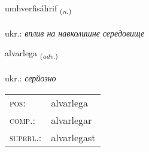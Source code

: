 \documentclass[frontgrid, backgrid]{flacards}\usepackage[]{graphicx}\usepackage[]{xcolor}
\begin{document}
\renewcommand{\blhead}{\vskip5pt {\small\bfseries\footnotesize Nafnorð | іменник }}
\renewcommand{\bcfoot}{\vskip5pt \hspace{2pt}{\small\bfseries\footnotesize 3K}}


{umhverfisáhrif \small{\textsubscript{(\textit{n.})}} \\[1ex] %
\textphonetic{[ʏmkʰvɛrvɪsaur̥ɪv]} \\
ukr.: \emph{вплив на навколишнє середовище} \\  [2ex]
\renewcommand*{\arraystretch}{0.8}
}

\renewcommand{\flhead}{\vskip5pt \fboxsep=0pt {\small\bfseries\footnotesize Atviksorð | прислівник}}
\renewcommand{\fcfoot}{\vskip5pt \fboxsep=0pt \hspace{2pt}{\small\bfseries\footnotesize 3K}}

\renewcommand{\blhead}{\vskip5pt {\small\bfseries\footnotesize Atviksorð | прислівник }}
\renewcommand{\bcfoot}{\vskip5pt \hspace{2pt}{\small\bfseries\footnotesize 3K}}


{alvarlega \small{\textsubscript{(\textit{adv.})}} \\[1ex] %
\textphonetic{[alvarlɛɣa]} \\
ukr.: \emph{серйозно} \\  [2ex]
\renewcommand*{\arraystretch}{0.8}
\begin{tabular}{ll}
\textsc{pos}: & alvarlega \\ 
\textsc{comp.}: & alvarlegar \\ 
\textsc{superl.}: & alvarlegast \\
\end{tabular}
}
\end{document}
